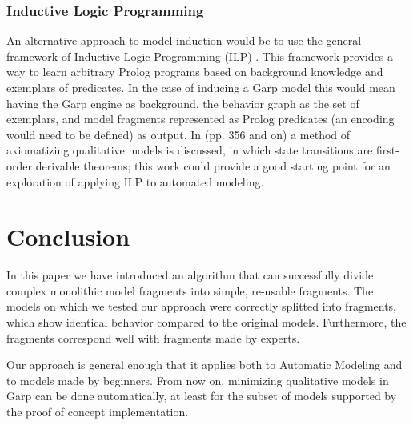 \documentclass{article} %
\begin{document}
\subsubsection{Inductive Logic Programming}

An alternative approach to model induction would be to use the general
framework of Inductive Logic Programming (ILP) \cite{mitchell}. This framework
provides a way to learn arbitrary Prolog programs based on background knowledge
and exemplars of predicates. In the case of inducing a Garp model this would
mean having the Garp engine as background, the behavior graph as the set of
exemplars, and model fragments represented as Prolog predicates (an encoding
would need to be defined) as output. In \cite{kuipers} (pp. 356 and on) a
method of axiomatizing qualitative models is discussed, in which state
transitions are first-order derivable theorems; this work could provide a good
starting point for an exploration of applying ILP to automated modeling.



\section{Conclusion}
\label{sec:conclusion}
In this paper we have introduced an algorithm that can successfully divide
complex monolithic model fragments into simple, re-usable fragments. The models
on which we tested our approach were correctly splitted into fragments, which
show identical behavior compared to the original models. Furthermore, the
fragments correspond well with fragments made by experts.

Our approach is general enough that it applies both to Automatic Modeling and to
models made by beginners. From now on, minimizing qualitative models in Garp
can be done automatically, at least for the subset of models supported by the
proof of concept implementation.

\end{document}
